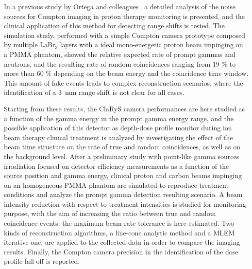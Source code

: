 In a previous study by Ortega and colleagues~\cite{Ortega:2015aa} a detailed analysis of the noise sources for Compton imaging in proton therapy monitoring is presented, and the clinical application of this method for detecting range shifts is tested. The simulation study, performed with a simple Compton camera prototype composed by multiple LaBr$_3$ layers with a ideal mono-energetic proton beam impinging on a PMMA phantom, showed the relative expected rate of prompt gammas and neutrons, and the resulting rate of random coincidences ranging from 19 \% to more than 60 \% depending on the beam energy and the coincidence time window. This amount of fake events leads to complex reconstruction scenarios, where the identification of a 3~mm range shift is not clear for all cases.
    
Starting from these results, the ClaRyS camera performances are here studied as a function of the gamma energy in the prompt gamma energy range, and the possible application of this detector as depth-dose profile monitor during ion beam therapy clinical treatment is analyzed by investigating the effect of the beam time structure on the rate of true and random coincidences, as well as on the background level. After a preliminary study with point-like gamma sources irradiation focused on detector efficiency measurements as a function of the source position and gamma energy, clinical proton and carbon beams impinging on an homogeneous PMMA phantom are simulated to reproduce treatment conditions and analyze the prompt gamma detection resulting scenario. A beam intensity reduction with respect to treatment intensities is studied for monitoring purpose, with the aim of increasing the ratio between true and random coincidence events: the maximum beam rate tolerance is here estimated. Two kinds of reconstruction algorithms, a line-cone analytic method and a MLEM iterative one, are applied to the collected data in order to compare the imaging results. Finally, the Compton camera precision in the identification of the dose profile fall-off is reported.   
